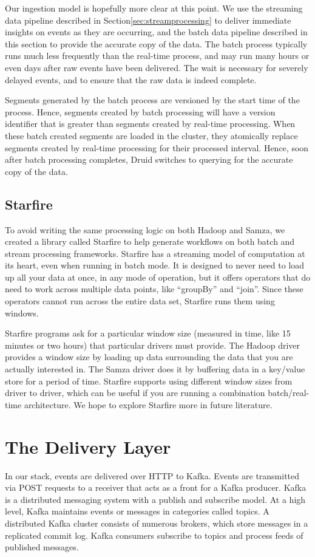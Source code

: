 \documentclass{vldb}
\begin{document}
Our ingestion model is hopefully more clear at this point. We use the streaming
data pipeline described in Section\ref{sec:streamprocessing} to deliver
immediate insights on events as they are occurring, and the batch data pipeline
described in this section to provide the accurate copy of the data. The batch
process typically runs much less frequently than the real-time process, and may
run many hours or even days after raw events have been delivered. The wait is
necessary for severely delayed events, and to ensure that the raw data is
indeed complete. 

Segments generated by the batch process are versioned by the start time of the
process. Hence, segments created by batch processing will have a version
identifier that is greater than segments created by real-time processing. When
these batch created segments are loaded in the cluster, they atomically replace
segments created by real-time processing for their processed interval. Hence,
soon after batch processing completes, Druid switches to querying for the
accurate copy of the data.

\subsection{Starfire}
To avoid writing the same processing logic on both Hadoop and Samza, we created
a library called Starfire to help generate workflows on both batch and stream
processing frameworks. Starfire has a streaming model of computation at its
heart, even when running in batch mode. It is designed to never need to load up
all your data at once, in any mode of operation, but it offers operators that
do need to work across multiple data points, like “groupBy” and “join”. Since
these operators cannot run across the entire data set, Starfire runs them using
windows.

Starfire programs ask for a particular window size (measured in time, like 15
minutes or two hours) that particular drivers must provide. The Hadoop driver
provides a window size by loading up data surrounding the data that you are
actually interested in. The Samza driver does it by buffering data in a
key/value store for a period of time. Starfire supports using different window
sizes from driver to driver, which can be useful if you are running a
combination batch/real-time architecture. We hope to explore Starfire more in
future literature.

\section{The Delivery Layer}
\label{sec:delivery}
In our stack, events are delivered over HTTP to Kafka. Events are transmitted
via POST requests to a receiver that acts as a front for a Kafka producer.
Kafka is a distributed messaging system with a publish and subscribe model. At
a high level, Kafka maintains events or messages in categories called topics. A
distributed Kafka cluster consists of numerous brokers, which store messages in
a replicated commit log. Kafka consumers subscribe to topics and process feeds
of published messages. 
\end{document}
